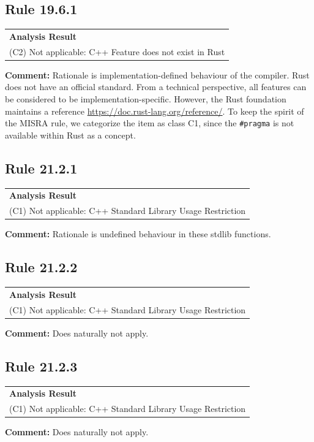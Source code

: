\subsection*{Rule 19.6.1}
\begin{longtable}{p{13cm}}
\textbf{Analysis Result} \\
(C2) Not applicable: C++ Feature does not exist in Rust \\
\end{longtable}
\textbf{Comment:} Rationale is implementation-defined behaviour of the \Cpp compiler. Rust does not have an official standard. From a technical perspective, all features can be considered to be implementation-specific. However, the Rust foundation maintains a reference \url{https://doc.rust-lang.org/reference/}. To keep the spirit of the MISRA rule, we categorize the item as class C1, since the \texttt{\#pragma} is not available within Rust as a concept. \\
\subsection*{Rule 21.2.1}
\begin{longtable}{p{13cm}}
\textbf{Analysis Result} \\
(C1) Not applicable: C++ Standard Library Usage Restriction \\
\end{longtable}
\textbf{Comment:} Rationale is undefined behaviour in these stdlib functions. \\
\subsection*{Rule 21.2.2}
\begin{longtable}{p{13cm}}
\textbf{Analysis Result} \\
(C1) Not applicable: C++ Standard Library Usage Restriction \\
\end{longtable}
\textbf{Comment:} Does naturally not apply. \\
\subsection*{Rule 21.2.3}
\begin{longtable}{p{13cm}}
\textbf{Analysis Result} \\
(C1) Not applicable: C++ Standard Library Usage Restriction \\
\end{longtable}
\textbf{Comment:} Does naturally not apply. \\
